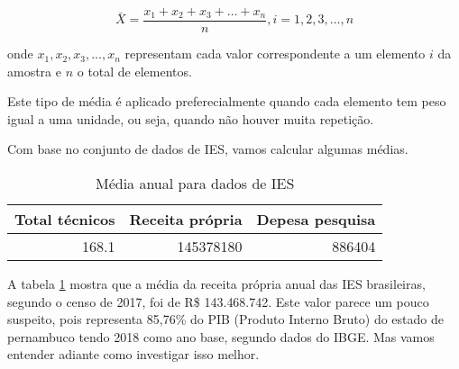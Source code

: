 \documentclass[12pt,]{style/krantz}
\makeatletter
\newenvironment{Shaded}{\begin{snugshade}}{\end{snugshade}}
\newcommand{\KeywordTok}[1]{\textcolor[rgb]{0.13,0.29,0.53}{\textbf{#1}}}
\newcommand{\DataTypeTok}[1]{\textcolor[rgb]{0.13,0.29,0.53}{#1}}
\newcommand{\StringTok}[1]{\textcolor[rgb]{0.31,0.60,0.02}{#1}}
\newcommand{\OperatorTok}[1]{\textcolor[rgb]{0.81,0.36,0.00}{\textbf{#1}}}
\newcommand{\NormalTok}[1]{#1}
\renewenvironment{quote}{\begin{VF}}{\end{VF}}
\newenvironment{kframe}{%
\medskip{}
\setlength{\fboxsep}{.8em}
 \def\at@end@of@kframe{}%
 \ifinner\ifhmode%
  \def\at@end@of@kframe{\end{minipage}}%
  \begin{minipage}{\columnwidth}%
 \fi\fi%
 \def\FrameCommand##1{\hskip\@totalleftmargin \hskip-\fboxsep
 \colorbox{shadecolor}{##1}\hskip-\fboxsep
     \hskip-\linewidth \hskip-\@totalleftmargin \hskip\columnwidth}%
 \MakeFramed {\advance\hsize-\width
   \@totalleftmargin\z@ \linewidth\hsize
   \@setminipage}}%
 {\par\unskip\endMakeFramed%
 \at@end@of@kframe}
\renewenvironment{Shaded}{\begin{kframe}}{\end{kframe}}
\theoremstyle{definition}
\theoremstyle{definition}
\theoremstyle{definition}
\theoremstyle{remark}
\let\BeginKnitrBlock\begin \let\EndKnitrBlock\end
\makeatother
\begin{document}
\[\bar X = \frac{x_1 + x_2 + x_3 + \dots + x_n}{n}, i = 1, 2, 3, \dots, n\]

onde \(x_1, x_2, x_3, \dots, x_n\) representam cada valor correspondente
a um elemento \(i\) da amostra e \(n\) o total de elementos.

\begin{quote}
Este tipo de média é aplicado preferecialmente quando cada elemento tem
peso igual a uma unidade, ou seja, quando não houver muita repetição.
\end{quote}

\BeginKnitrBlock{example}
\protect\hypertarget{exm:unnamed-chunk-50}{}{\label{exm:unnamed-chunk-50}
}Com base no conjunto de dados de IES, vamos calcular algumas médias.
\EndKnitrBlock{example}

\begin{Shaded}
\end{Shaded}

\begin{table}[!h]

\caption{\label{tab:tab06}Média anual para dados de IES}
\centering
\begin{tabular}{r|r|r}
\hline
Total técnicos & Receita própria & Depesa pesquisa\\
\hline
168.1 & 145378180 & 886404\\
\hline
\end{tabular}
\end{table}

A tabela \ref{tab:tab06} mostra que a média da receita própria anual das
IES brasileiras, segundo o censo de 2017, foi de R\$ 143.468.742. Este
valor parece um pouco suspeito, pois representa 85,76\% do PIB (Produto
Interno Bruto) do estado de pernambuco tendo 2018 como ano base, segundo
dados do IBGE. Mas vamos entender adiante como investigar isso melhor.
\end{document}
